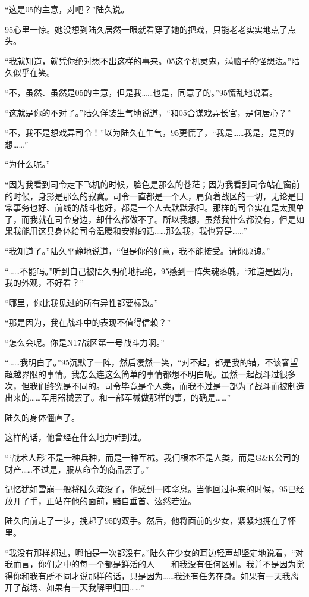 “这是05的主意，对吧？”陆久说。

95心里一惊。她没想到陆久居然一眼就看穿了她的把戏，只能老老实实地点了点头。

“我就知道，就凭你绝对想不出这样的事来。05这个机灵鬼，满脑子的怪想法。”陆久似乎在笑。

“不，虽然、虽然是05的主意，但是我……也是，同意了的。”95慌乱地说着。

“这就是你的不对了。”陆久佯装生气地说道，“和05合谋戏弄长官，是何居心？”

“不，我不是想戏弄司令！”以为陆久在生气，95更慌了，“我是……我是，是真的想……”

“为什么呢。”

“因为我看到司令走下飞机的时候，脸色是那么的苍茫；因为我看到司令站在窗前的时候，身影是那么的寂寞。司令一直都是一个人，肩负着战区的一切，无论是日常事务也好、前线的战斗也好，都是一个人去默默承担。那样的司令实在是太孤单了，而我就在司令身边，却什么都做不了。所以我想，虽然我什么都没有，但是如果我能用这具身体给司令温暖和安慰的话……那么我，我也算是……”

“我知道了。”陆久平静地说道，“但是你的好意，我不能接受。请你原谅。”

“……不能吗。”听到自己被陆久明确地拒绝，95感到一阵失魂落魄，“难道是因为，我的外观，不好看？”

“哪里，你比我见过的所有异性都要标致。”

“那是因为，我在战斗中的表现不值得信赖？”

“怎么会呢。你是N17战区第一号战斗力啊。”

“……我明白了。”95沉默了一阵，然后凄然一笑，“对不起，都是我的错，不该奢望超越界限的事情。我怎么连这么简单的事情都想不明白呢。虽然一起战斗过很多次，但我们终究是不同的。司令毕竟是个人类，而我不过是一部为了战斗而被制造出来的……军用器械罢了。和一部军械做那样的事，的确是……”

陆久的身体僵直了。

这样的话，他曾经在什么地方听到过。

“‘战术人形’不是一种兵种，而是一种军械。我们根本不是人类，而是G\&K公司的财产……不过是，服从命令的商品罢了。”

记忆犹如雪崩一般将陆久淹没了，他感到一阵窒息。当他回过神来的时候，95已经放开了手，正站在他的面前，黯自垂首、泫然若泣。

陆久向前走了一步，挽起了95的双手。然后，他将面前的少女，紧紧地拥在了怀里。

“我没有那样想过，哪怕是一次都没有。”陆久在少女的耳边轻声却坚定地说着，“对我而言，你们之中的每一个都是鲜活的人——和我没有任何区别。我并不是因为觉得你和我有所不同才说那样的话，只是因为……我还有任务在身。如果有一天我离开了战场、如果有一天我解甲归田……”

